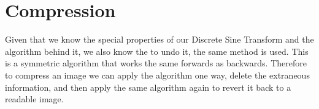 \section{Compression}
Given that we know the special properties of our Discrete Sine Transform and the algorithm behind it, we also know the to undo it, the same method is used. This is a symmetric algorithm that works the same forwards as backwards. Therefore to compress an image we can apply the algorithm one way, delete the extraneous information, and then apply the same algorithm again to revert it back to a readable image.
